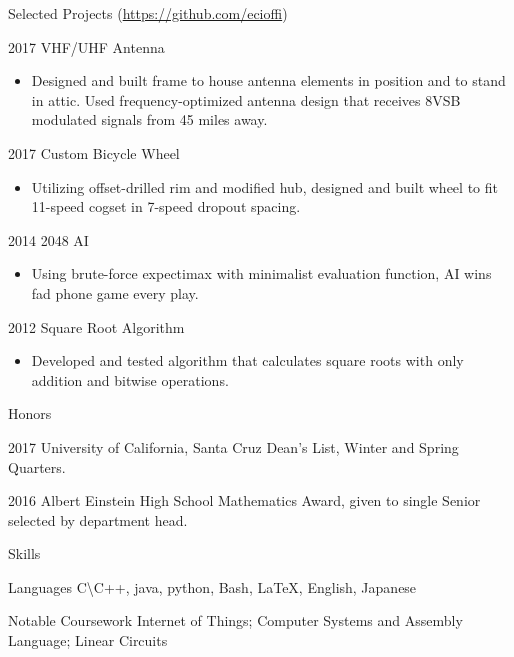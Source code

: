 \documentclass[11pt, letterpaper]{article}
\renewcommand*{\cvlabelfont}{\conds} %
\newcommand{\compactspacing}{\setlength{\itemsep}{-0.35em}} %
\newcommand{\describe}[1] {
    \begin{itemize}[label=---, topsep=-0.5em, itemindent=0em, labelsep=0.5em, leftmargin=2em]
    \small
    \item#1
    \end{itemize}
}
\begin{document}
\begin{cv}{\color{blue}{Eric A. Cioffi}}
\settowidth{\cvlabelwidth}{\cvlabelfont 2012} %
\begin{cvlist}{Selected Projects \normalfont(\url{https://github.com/ecioffi})}
    \compactspacing
    
    \item[2017] VHF/UHF Antenna
    \describe{Designed and built frame to house antenna elements in position and to stand in attic. Used frequency-optimized antenna design that receives 8VSB modulated signals from 45 miles away.}
    
    \item[2017] Custom Bicycle Wheel
    \describe{Utilizing offset-drilled rim and modified hub, designed and built wheel to fit 11-speed cogset in 7-speed dropout spacing.}
    
    \item[2014] 2048 AI
    \describe{Using brute-force expectimax with minimalist evaluation function, AI wins fad phone game every play.}
    
    \item[2012] Square Root Algorithm
    \describe{Developed and tested algorithm that calculates square roots with only addition and bitwise operations.}
\end{cvlist}
\renewcommand*{\cvlistheadingfont}{\large\bfseries}

\begin{cvlist}{Honors}
    \compactspacing
    
    \item[2017] University of California, Santa Cruz Dean's List, Winter and Spring Quarters.
    \item[2016] Albert Einstein High School Mathematics Award, given to single Senior selected by department head.
\end{cvlist}

\setlength{\cvlabelsep}{2em}
\settowidth{\cvlabelwidth}{\cvlabelfont Independent Learning} %
\begin{cvlist}{Skills}
    \compactspacing
    
    \item[Languages] C\textbackslash C++, java, python, Bash, \LaTeX, English, Japanese
    \item[Notable Coursework] Internet of Things; Computer Systems and Assembly Language; Linear Circuits
    

\end{cvlist}
\end{cv}
\end{document}
